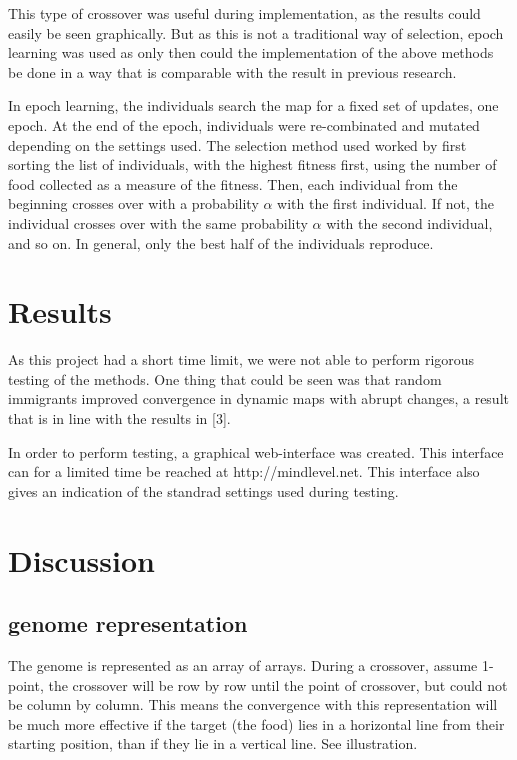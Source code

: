 \documentclass[a4paper,12pt]{article}
\begin{document}
This type of crossover was useful during implementation, as the results could easily be seen graphically. But as this is not a traditional way of selection, epoch learning was used as only then could the implementation of the above methods be done in a way that is comparable with the result in previous research.

In epoch learning, the individuals search the map for a fixed set of updates, one epoch. At the end of the epoch, individuals were re-combinated and mutated depending on the settings used. The selection method used worked by first sorting the list of individuals, with the highest fitness first, using the number of food collected as a measure of the fitness. Then, each individual from the beginning crosses over with a probability $\alpha$ with the first individual. If not, the individual crosses over with the same probability $\alpha$ with the second individual, and so on. In general, only the best half of the individuals reproduce.

\section{Results}
As this project had a short time limit, we were not able to perform rigorous testing of the methods. One thing that could be seen was that random immigrants improved convergence in dynamic maps with abrupt changes, a result that is in line with the results in [3]. 

In order to perform testing, a graphical web-interface was created. This interface can for a limited time be reached at http://mindlevel.net. This interface also gives an indication of the standrad settings used during testing.

\section{Discussion}
\subsection{genome representation}
The genome is represented as an array of arrays. During a crossover, assume 1-point, the crossover will be row by row until the point of crossover, but could not be column by column. This means the convergence with this representation will be much more effective if the target (the food) lies in a horizontal line from their starting position, than if they lie in a vertical line. See illustration.
\end{document}
